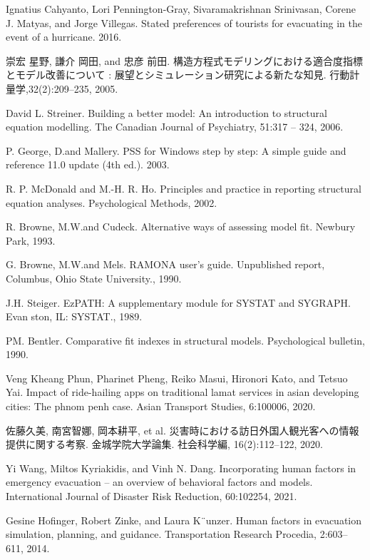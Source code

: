 \documentclass[letterpaper,12pt,titlepage,oneside,final,a4j,dvipdfmx]{book}
\begin{document}
\begin{thebibliography}{60}
 Ignatius Cahyanto, Lori Pennington-Gray, Sivaramakrishnan Srinivasan, Corene J.
Matyas, and Jorge Villegas. Stated preferences of tourists for evacuating in the event
of a hurricane. 2016.

 崇宏 星野, 謙介 岡田, and 忠彦 前田. 構造方程式モデリングにおける適合度指標とモデル改善について : 展望とシミュレーション研究による新たな知見. 行動計量学,32(2):209–235, 2005.

 David L. Streiner. Building a better model: An introduction to structural equation modelling. The Canadian Journal of Psychiatry, 51:317 – 324, 2006.


 P. George, D.and Mallery. PSS for Windows step by step: A simple guide and reference 11.0 update (4th ed.). 2003.

 R. P. McDonald and M.-H. R. Ho. Principles and practice in reporting structural equation analyses. Psychological Methods, 2002.

  R. Browne, M.W.and Cudeck. Alternative ways of assessing model fit. Newbury Park, 1993.

  G. Browne, M.W.and Mels. RAMONA user's guide. Unpublished report, Columbus, Ohio State University., 1990.

  J.H. Steiger. EzPATH: A supplementary module for SYSTAT and SYGRAPH. Evan ston, IL: SYSTAT., 1989.

 PM. Bentler. Comparative fit indexes in structural models. Psychological bulletin, 1990.

  Veng Kheang Phun, Pharinet Pheng, Reiko Masui, Hironori Kato, and Tetsuo Yai. Impact of ride-hailing apps on traditional lamat services in asian developing cities: The phnom penh case. Asian Transport Studies, 6:100006, 2020.


 佐藤久美, 南宮智娜, 岡本耕平, et al. 災害時における訪日外国人観光客への情報提供に関する考察. 金城学院大学論集. 社会科学編, 16(2):112–122, 2020.


  Yi Wang, Miltos Kyriakidis, and Vinh N. Dang. Incorporating human factors in emergency evacuation – an overview of behavioral factors and models. International Journal of Disaster Risk Reduction, 60:102254, 2021.

 Gesine Hofinger, Robert Zinke, and Laura K¨unzer. Human factors in evacuation simulation, planning, and guidance. Transportation Research Procedia, 2:603–611, 2014.



\end{thebibliography}
\end{document}
